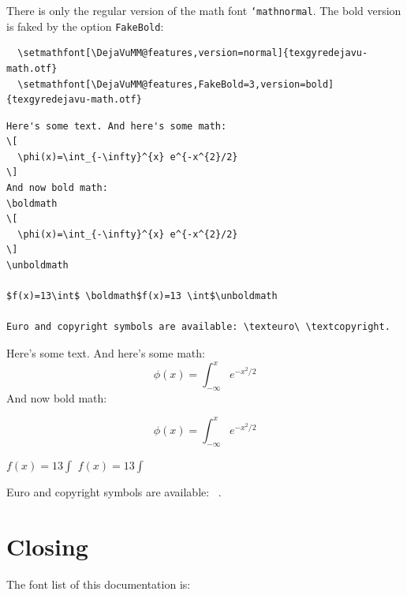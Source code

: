 \documentclass[11pt]{article}
\DeclareRobustCommand\cs[1]{\mbox{\texttt{\char`\\#1}}}
\begin{document}
There is only the regular version of the math font \cs{mathnormal}. The bold version is
faked by the option \texttt{FakeBold}:

\begin{verbatim}
  \setmathfont[\DejaVuMM@features,version=normal]{texgyredejavu-math.otf}
  \setmathfont[\DejaVuMM@features,FakeBold=3,version=bold]{texgyredejavu-math.otf}
\end{verbatim}



\begin{verbatim}
Here's some text. And here's some math:
\[ 
  \phi(x)=\int_{-\infty}^{x} e^{-x^{2}/2} 
\]
And now bold math:
\boldmath
\[ 
  \phi(x)=\int_{-\infty}^{x} e^{-x^{2}/2} 
\]
\unboldmath

$f(x)=13\int$ \boldmath$f(x)=13 \int$\unboldmath

Euro and copyright symbols are available: \texteuro\ \textcopyright.
\end{verbatim}

Here's some text. And here's some math:
\[ 
  \phi(x)=\int_{-\infty}^{x} e^{-x^{2}/2} 
\]
And now bold math:

\boldmath

\[ 
 \phi(x)=\int_{-\infty}^{x} e^{-x^{2}/2} 
\]
\unboldmath

$f(x)=13\int$ \boldmath$f(x)=13 \int$\unboldmath

Euro and copyright symbols are available: \texteuro\ \textcopyright.

\section{Closing}
The font list of this documentation is:

\scriptsize\ttfamily
\expandafter\IfFileExists\expandafter{\jobname.fonts}%
  {}{}

\normalfont\rmfamily

\nocite{*}
\printbibliography
\end{document}
